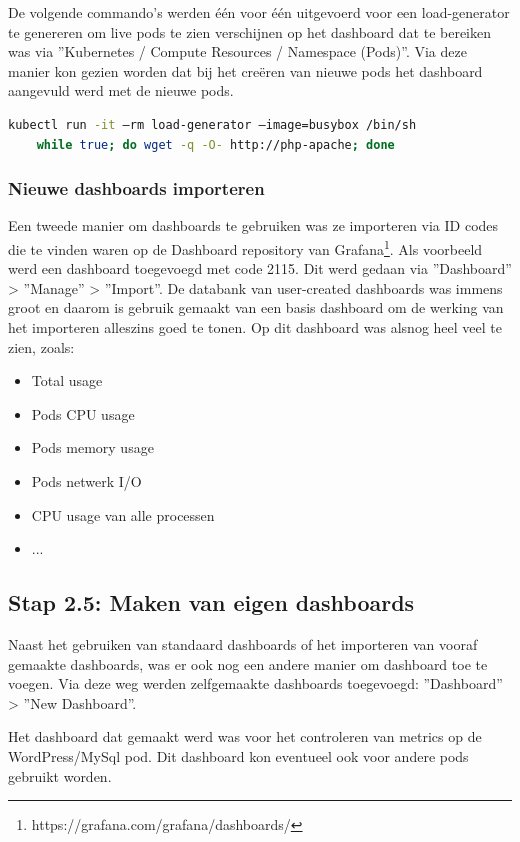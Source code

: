 De volgende commando's werden één voor één uitgevoerd voor een load-generator te genereren om live pods te zien verschijnen op het dashboard dat te bereiken was via ''Kubernetes / Compute Resources / Namespace (Pods)''. Via deze manier kon gezien worden dat bij het creëren van nieuwe pods het dashboard aangevuld werd met de nieuwe pods.

\begin{lstlisting}[language=bash,caption={load-generator}]
    kubectl run -it –rm load-generator –image=busybox /bin/sh 
    while true; do wget -q -O- http://php-apache; done
\end{lstlisting}

\subsubsection{Nieuwe dashboards importeren}

Een tweede manier om dashboards te gebruiken was ze importeren via ID codes die te vinden waren op de Dashboard repository van Grafana\footnote{https://grafana.com/grafana/dashboards/}. Als voorbeeld werd een dashboard toegevoegd met code 2115. Dit werd gedaan via ''Dashboard'' > ''Manage'' > ''Import''. De databank van user-created dashboards was immens groot en daarom is gebruik gemaakt van een basis dashboard om de werking van het importeren alleszins goed te tonen. Op dit dashboard was alsnog heel veel te zien, zoals:

\begin{itemize}
    \item Total usage
    \item Pods CPU usage
    \item Pods memory usage
    \item Pods netwerk I/O
    \item CPU usage van alle processen
    \item ...
\end{itemize}
\clearpage
\subsection{Stap 2.5: Maken van eigen dashboards}

Naast het gebruiken van standaard dashboards of het importeren van vooraf gemaakte dashboards, was er ook nog een andere manier om dashboard toe te voegen. Via deze weg werden zelfgemaakte dashboards toegevoegd: ''Dashboard'' > ''New Dashboard''.

Het dashboard dat gemaakt werd was voor het controleren van metrics op de WordPress/MySql pod. Dit dashboard kon eventueel ook voor andere pods gebruikt worden. 

